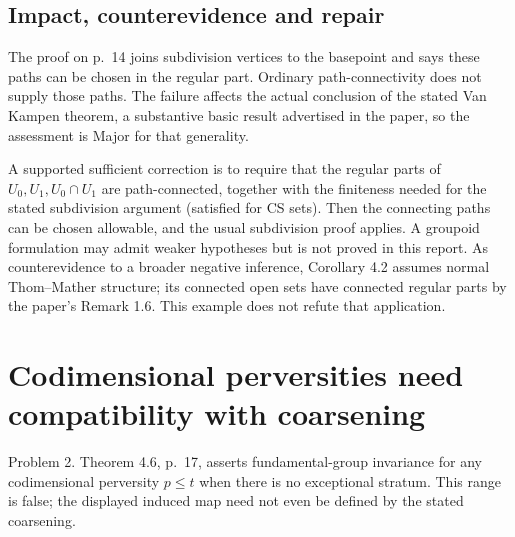 \documentclass[10pt]{article}
\begin{document}
\subsection*{Impact, counterevidence and repair}
The proof on p. 14 joins subdivision vertices to the basepoint and says these paths can be chosen in the regular part. Ordinary path-connectivity does not supply those paths. The failure affects the actual conclusion of the stated Van Kampen theorem, a substantive basic result advertised in the paper, so the assessment is Major for that generality.\par
A supported sufficient correction is to require that the regular parts of \(U_0,U_1,U_0\cap U_1\) are path-connected, together with the finiteness needed for the stated subdivision argument (satisfied for CS sets). Then the connecting paths can be chosen allowable, and the usual subdivision proof applies. A groupoid formulation may admit weaker hypotheses but is not proved in this report. As counterevidence to a broader negative inference, Corollary 4.2 assumes normal Thom–Mather structure; its connected open sets have connected regular parts by the paper’s Remark 1.6. This example does not refute that application.\par
\section*{Codimensional perversities need compatibility with coarsening}
Problem 2.  Theorem 4.6, p. 17, asserts fundamental-group invariance for any codimensional perversity \(p\leq t\) when there is no exceptional stratum. This range is false; the displayed induced map need not even be defined by the stated coarsening.\par
\end{document}
